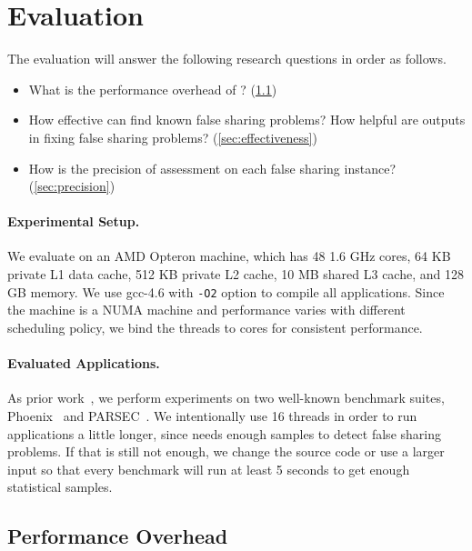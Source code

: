 \section{Evaluation}
\label{sec:eval}

\sloppy{}
The evaluation will answer the following research questions in order as follows. 

\begin{itemize}
\item What is the performance overhead of \cheetah{}? (\ref{sec:perf})

\item How effective can \cheetah{} find known false sharing problems? How helpful are outputs in fixing false sharing problems?  (\ref{sec:effectiveness})

\item How is the precision of assessment on each false sharing instance?  (\ref{sec:precision})

\end{itemize}

\paragraph{Experimental Setup.} We evaluate \cheetah{} on an AMD Opteron machine, which has 48 1.6 GHz cores, 64 KB private L1 data cache, 512 KB private L2 cache, 10 MB shared L3 cache, and 128 GB memory. We use gcc-4.6 with {\tt -O2} option to compile all applications. Since the machine is a NUMA machine and performance varies with different scheduling policy, we bind the threads to cores for consistent performance.   

\paragraph{Evaluated Applications.} As prior work~\cite{Sheriff, Predator, qinzhao, mldetect}, we perform experiments on two well-known benchmark suites, Phoenix~\cite{phoenix-hpca} and PARSEC~\cite{parsec}. We intentionally use 16 threads in order to run applications a little longer, since \cheetah{} needs enough samples to detect false sharing problems. If that is still not enough, we change the source code or use a larger input so that every benchmark will run at least 5 seconds to get enough statistical samples.

\subsection{Performance Overhead}
\label{sec:perf}

